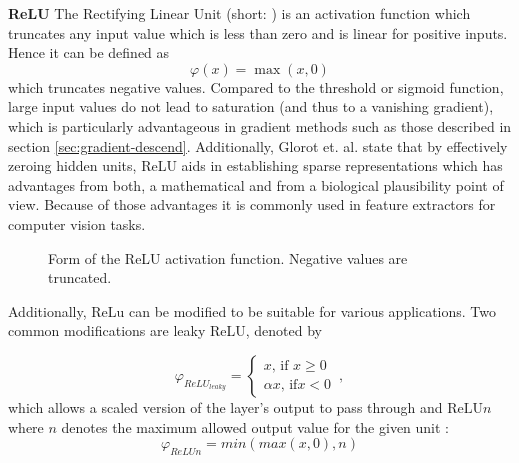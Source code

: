 		
		\textbf{ReLU}
		The Rectifying Linear Unit (short: ) is an activation function which truncates any input value which is less than zero and is linear for positive inputs. Hence it can be defined as
		\begin{equation}
		\label{eq:relu_def}
		\varphi(x) = \max(x, 0)
		\end{equation}
		which truncates negative values. Compared to the threshold or sigmoid function, large input values do not lead to saturation (and thus to a vanishing gradient), which is particularly advantageous in gradient methods such as those described in section \ref{sec:gradient-descend}. Additionally, Glorot et. al. \cite{Glorot2011} state that by effectively zeroing hidden units, ReLU aids in establishing sparse representations which has advantages from both, a mathematical and from a biological plausibility point of view. Because of those advantages it is commonly used in feature extractors for computer vision tasks. \\
		
		\begin{figure}[ht]
			\centering
			\caption{Form of the ReLU activation function. Negative values are truncated.}
			\label{fig:relu_plot}
		\end{figure}
		
		Additionally, ReLu can be modified to be suitable for various applications. Two common modifications are leaky ReLU, denoted by 
		
		\begin{equation}
		\varphi_{ReLU_{leaky}} = \begin{cases}
		x \text{, if } x \geq 0 \\
		\alpha x \text{, if} x < 0
		\end{cases} \,,
		\end{equation} 
		which allows a scaled version of the layer's output to pass through and $\text{ReLU}n$ where $n$ denotes the maximum allowed output value for the given unit \cite{Sandler}:
		\begin{equation}
		\varphi_{ReLUn} = min(max(x, 0), n)
		\end{equation}
	
